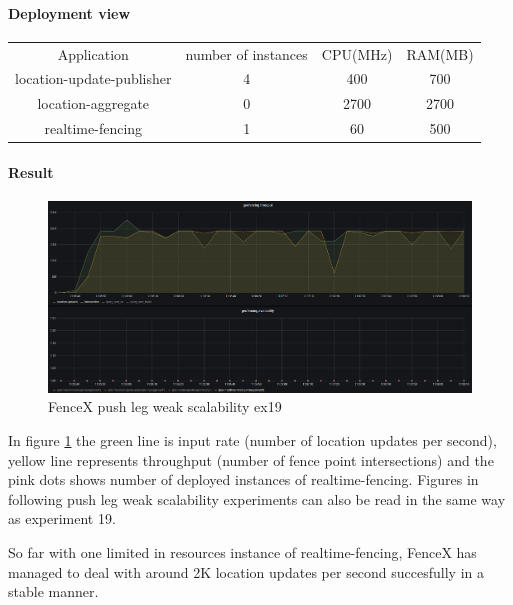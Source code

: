 \documentclass[a4]{report}
\begin{document}
        \paragraph{Deployment view}
        \begin{center}
            \begin{tabular}{ c c c c }
                Application               & number of instances & CPU(MHz) & RAM(MB) \\
                location-update-publisher & 4                   & 400      & 700     \\
                location-aggregate        & 0                   & 2700     & 2700    \\
                realtime-fencing          & 1                   & 60       & 500     \\
            \end{tabular}
        \end{center}

        \paragraph{Result}
        \begin{figure}[ht]
            \caption{FenceX push leg weak scalability ex19}
            \label{fig:ex19}
            \includegraphics[scale=0.4]{images/evaluation/ex19-benchmarking-ongoing-1per16sec.png}
        \end{figure}

        In figure \ref{fig:ex19} the green line is input rate (number of location updates per second),
        yellow line represents throughput (number of fence point intersections) and the pink dots shows number of
        deployed instances of realtime-fencing.
        Figures in following push leg weak scalability experiments can also be read in the same way as experiment 19.

        So far with one limited in resources instance of realtime-fencing, FenceX has managed to deal with around 2K
        location updates per second succesfully in a stable manner.
\end{document}
